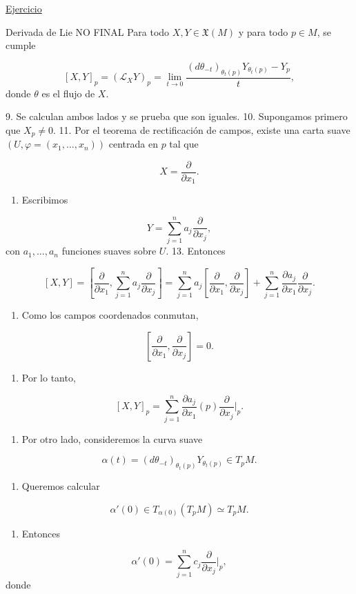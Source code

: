\begin{bookproof}{}
\hyperref[blk:d6291e]{Ejercicio}

\bookqed
\end{bookproof}
\begin{booktheorem}{Derivada de Lie NO FINAL}
Para todo $X,Y\in\mathfrak X(M)$ y para todo $p\in M$, se cumple

\[
[X,Y]_p=(\mathcal L_XY)_p=\lim_{t\to0}\frac{(d\theta_{-t})_{\theta_t(p)}Y_{\theta_t(p)}-Y_p}{t},
\]
donde $\theta$ es el flujo de $X$.

\end{booktheorem}
\begin{bookproof}{}
9. Se calculan ambos lados y se prueba que son iguales. 10. Supongamos primero que $X_p\neq0$. 11. Por el teorema de rectificación de campos, existe una carta suave $(U,\varphi=(x_1,\ldots,x_n))$ centrada en $p$ tal que

\[
X=\frac{\partial}{\partial x_1}.
\]
\begin{enumerate}[start=12]
\item Escribimos
\end{enumerate}
\[
Y=\sum_{j=1}^n a_j\frac{\partial}{\partial x_j},
\]
con $a_1,\ldots,a_n$ funciones suaves sobre $U$. 13. Entonces

\[
[X,Y]=\left[\frac{\partial}{\partial x_1},\sum_{j=1}^n a_j\frac{\partial}{\partial x_j}\right]=\sum_{j=1}^n a_j\left[\frac{\partial}{\partial x_1},\frac{\partial}{\partial x_j}\right]+\sum_{j=1}^n \frac{\partial a_j}{\partial x_1}\frac{\partial}{\partial x_j}.
\]
\begin{enumerate}[start=14]
\item Como los campos coordenados conmutan,
\end{enumerate}
\[
\left[\frac{\partial}{\partial x_1},\frac{\partial}{\partial x_j}\right]=0.
\]
\begin{enumerate}[start=15]
\item Por lo tanto,
\end{enumerate}
\[
[X,Y]_p=\sum_{j=1}^n \frac{\partial a_j}{\partial x_1}(p)\frac{\partial}{\partial x_j}\bigg|_p.
\]
\begin{enumerate}[start=16]
\item Por otro lado, consideremos la curva suave
\end{enumerate}
\[
\alpha(t)=(d\theta_{-t})_{\theta_t(p)}Y_{\theta_t(p)}\in T_pM.
\]
\begin{enumerate}[start=17]
\item Queremos calcular
\end{enumerate}
\[
\alpha'(0)\in T_{\alpha(0)}(T_pM)\simeq T_pM.
\]
\begin{enumerate}[start=18]
\item Entonces
\end{enumerate}
\[
\alpha'(0)=\sum_{j=1}^n c_j\frac{\partial}{\partial x_j}\bigg|_p,
\]
donde


\end{bookproof}
